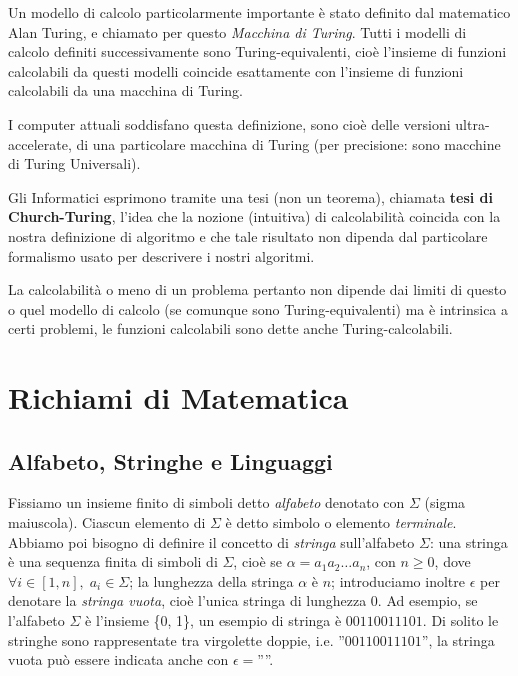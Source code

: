 Un modello di calcolo particolarmente importante è stato definito dal
matematico Alan Turing, e chiamato per questo \emph{Macchina di
  Turing}. Tutti i modelli di calcolo definiti successivamente sono
Turing-equivalenti, cioè l'insieme di funzioni calcolabili da questi
modelli coincide esattamente con l'insieme di funzioni calcolabili da
una macchina di Turing.

I computer attuali soddisfano questa definizione, sono cioè delle
versioni ultra-accelerate, di una particolare macchina di Turing (per
precisione: sono macchine di Turing Universali).

Gli Informatici esprimono tramite una tesi (non un teorema), chiamata
\textbf{tesi di Church-Turing}, l'idea che la nozione (intuitiva) di
calcolabilità coincida con la nostra definizione di algoritmo e che
tale risultato non dipenda dal particolare formalismo usato per
descrivere i nostri algoritmi.

La calcolabilità o meno di un problema pertanto non dipende dai limiti
di questo o quel modello di calcolo (se comunque sono
Turing-equivalenti) ma è intrinsica a certi problemi, le funzioni
calcolabili sono dette anche Turing-calcolabili.


\appendix
\chapter{Richiami di Matematica}

\section{Alfabeto, Stringhe e Linguaggi}

Fissiamo un insieme finito di simboli detto \emph{alfabeto}  denotato con $\Sigma$ (sigma maiuscola). Ciascun elemento di $\Sigma$ è detto simbolo o elemento \emph{terminale}. Abbiamo poi bisogno di definire il concetto di \emph{stringa} sull'alfabeto $\Sigma$: una stringa è una sequenza finita di simboli di $\Sigma$, cioè se $\alpha = a_1a_2 \ldots a_n$, con $n \geq 0$, dove $\forall i \in [1,n],\; a_i \in \Sigma$; la lunghezza della stringa $\alpha$ è $n$; introduciamo inoltre $\epsilon$ per denotare la \emph{stringa vuota}, cioè l'unica stringa di lunghezza $0$. Ad esempio, se l'alfabeto $\Sigma$ è l'insieme \{0, 1\}, un esempio di stringa è $00110011101$.  Di solito le stringhe sono rappresentate tra virgolette doppie, i.e. ''$00110011101$'', la stringa vuota può essere indicata anche con $\epsilon = $''''.

